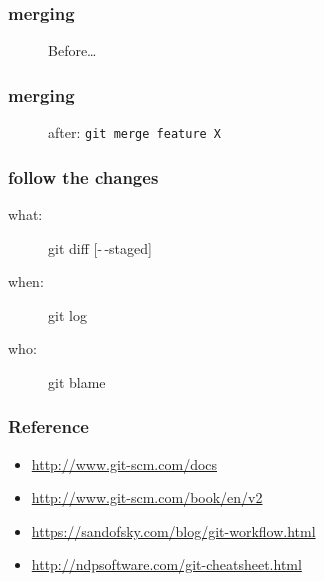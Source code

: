 \begin{frame}
    \frametitle{merging}
    \begin{figure}[b]
        \centering
        \caption{Before\ldots}
    \end{figure}
\end{frame}

\begin{frame}
    \frametitle{merging}
    \begin{figure}[b]
        \centering
        \caption{after: \texttt{git merge feature X}}
    \end{figure}
\end{frame}

\begin{frame}
    \frametitle{follow the changes}
    \begin{description}
        \item[what:] git diff [-\,-staged]
        \item[when:] git log
        \item[who:] git blame
    \end{description}
\end{frame}

\begin{frame}
    \frametitle{Reference}
    \begin{itemize}
        \item \url{http://www.git-scm.com/docs} %
        \item \url{http://www.git-scm.com/book/en/v2} %
        \item \url{https://sandofsky.com/blog/git-workflow.html} %
        \item \url{http://ndpsoftware.com/git-cheatsheet.html} %
    \end{itemize}
\end{frame}
